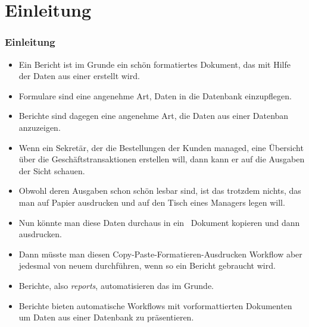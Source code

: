 \documentclass[aspectratio=169,mathserif,notheorems]{beamer}%
\subtitle{22.~Fabrik-Datenbank:~Berichte in LibreOffice Base}%
\begin{document}
%
%
\startPresentation%
%
\section{Einleitung}%
%
\begin{frame}[t]%
\frametitle{Einleitung}%
%
\begin{itemize}%
%
%
\item<2-> Ein Bericht ist im Grunde ein schön formatiertes Dokument, das mit Hilfe der Daten aus einer  erstellt wird.%
%
\item<3-> Formulare sind eine angenehme Art, Daten in die Datenbank einzupflegen.%
%
\item<4-> Berichte sind dagegen eine angenehme Art, die Daten aus einer Datenban anzuzeigen.%
%
\item<5-> Wenn ein Sekretär, der die Bestellungen der Kunden managed, eine Übersicht über die Geschäftstransaktionen erstellen will, dann kann er auf die Ausgaben der Sicht  schauen.%
%
\item<6-> Obwohl deren Ausgaben schon schön lesbar sind, ist das trotzdem nichts, das man auf Papier ausdrucken und auf den Tisch eines Managers legen will.%
%
\item<7-> Nun könnte man diese Daten durchaus in ein \microsoftWord\ Dokument kopieren und dann ausdrucken.%
%
\item<8-> Dann müsste man diesen Copy-Paste-Formatieren-Ausdrucken Workflow aber jedesmal von neuem durchführen, wenn so ein Bericht gebraucht wird.%
%
\item<9-> Berichte, also \emph{reports}, automatisieren das im Grunde.%
%
\item<10-> Berichte bieten automatische Workflows mit vorformattierten Dokumenten um Daten aus einer Datenbank zu präsentieren.
\end{itemize}%
\end{frame}%
%
%
\end{document}
